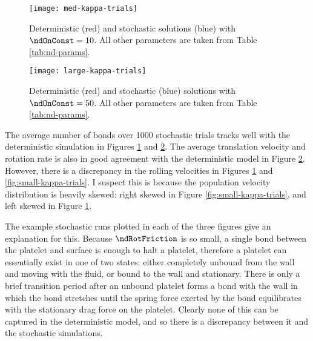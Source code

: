 \begin{figure}
  \centering
  \texttt{[image: med-kappa-trials]}
  \caption[Deterministic and stochastic solutions with
  $\ndOnConst = 10$]{Deterministic (red) and stochastic solutions
    (blue) with $\ndOnConst = 10$. All other parameters are taken from
    Table \ref{tab:nd-params}.}
  \label{fig:med-kappa-trials}
\end{figure}

\begin{figure}
  \centering
  \texttt{[image: large-kappa-trials]}
  \caption[Deterministic and stochastic solutions with
  $\ndOnConst = 50$.]{Deterministic (red) and stochastic (blue)
    solutions with $\ndOnConst = 50$. All other parameters are taken
    from Table \ref{tab:nd-params}.}
  \label{fig:large-kappa-trials}
\end{figure}

The average number of bonds over 1000 stochastic trials tracks well
with the deterministic simulation in Figures
\ref{fig:med-kappa-trials} and \ref{fig:large-kappa-trials}. The
average translation velocity and rotation rate is also in good
agreement with the deterministic model in Figure
\ref{fig:large-kappa-trials}. However, there is a discrepancy in the
rolling velocities in Figures \ref{fig:med-kappa-trials} and
\ref{fig:small-kappa-trials}. I suspect this is because the population
velocity distribution is heavily skewed: right skewed in Figure
\ref{fig:small-kappa-trials}, and left skewed in Figure
\ref{fig:med-kappa-trials}.

The example stochastic runs plotted in each of the three figures give
an explanation for this. Because $\ndRotFriction$ is so small, a
single bond between the platelet and surface is enough to halt a
platelet, therefore a platelet can essentially exist in one of two
states: either completely unbound from the wall and moving with the
fluid, or bound to the wall and stationary. There is only a brief
transition period after an unbound platelet forms a bond with the wall
in which the bond stretches until the spring force exerted by the bond
equilibrates with the stationary drag force on the platelet. Clearly
none of this can be captured in the deterministic model, and so there
is a discrepancy between it and the stochastic simulations.

